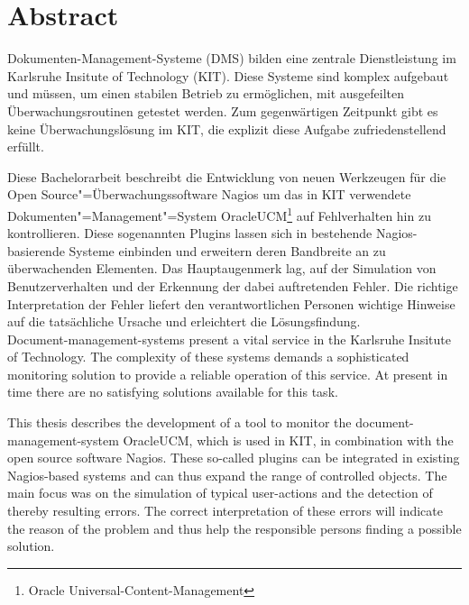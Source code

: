 \section*{Abstract}


Dokumenten-Management-Systeme (\gls{DMS}) bilden eine zentrale Dienstleistung im Karlsruhe Insitute of Technology (KIT).
Diese Systeme sind komplex aufgebaut und müssen, um einen stabilen Betrieb zu ermöglichen, mit ausgefeilten Überwachungsroutinen getestet werden.
Zum gegenwärtigen Zeitpunkt gibt es keine Überwachungslösung im KIT, die explizit diese Aufgabe zufriedenstellend erfüllt.

Diese Bachelorarbeit beschreibt die Entwicklung von neuen Werkzeugen für die Open Source"=Überwachungssoftware Nagios um das in KIT verwendete Dokumenten"=Management"=System \gls{OracleUCM}\footnote{Oracle Universal-Content-Management} auf Fehlverhalten hin zu kontrollieren.
Diese sogenannten Plugins lassen sich in bestehende Nagios-basierende Systeme einbinden und erweitern deren Bandbreite an zu überwachenden Elementen.
Das Hauptaugenmerk lag, auf der Simulation von Benutzerverhalten und der Erkennung der dabei auftretenden Fehler.
Die richtige Interpretation der Fehler liefert den verantwortlichen Personen wichtige Hinweise auf die tatsächliche Ursache und erleichtert die Lösungsfindung. \\

Document-management-systems present a vital service in the Karlsruhe Insitute of Technology.
The complexity of these systems demands a sophisticated monitoring solution to provide a reliable operation of this service.
At present in time there are no satisfying solutions available for this task.

This thesis describes the development of a tool to monitor the document-management-system \gls{OracleUCM}, which is used in KIT, in combination with the open source software Nagios.
These so-called plugins can be integrated in existing Nagios-based systems and can thus expand the range of controlled objects.
The main focus was on the simulation of typical user-actions and the detection of thereby resulting errors.
The correct interpretation of these errors will indicate the reason of the problem and thus help the responsible persons finding a possible solution.

